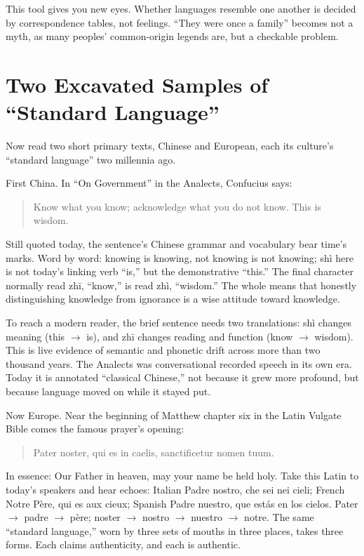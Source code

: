 This tool gives you new eyes. Whether languages resemble one another is decided by correspondence tables, not feelings. ``They were once a family'' becomes not a myth, as many peoples' common-origin legends are, but a checkable problem.

\section{Two Excavated Samples of ``Standard Language''}
Now read two short primary texts, Chinese and European, each its culture's ``standard language'' two millennia ago.

First China. In ``On Government'' in the Analects, Confucius says:

\begin{quote}
Know what you know; acknowledge what you do not know. This is wisdom.
\end{quote}
Still quoted today, the sentence's Chinese grammar and vocabulary bear time's marks. Word by word: knowing is knowing, not knowing is not knowing; shì here is not today's linking verb ``is,'' but the demonstrative ``this.'' The final character normally read zhī, ``know,'' is read zhì, ``wisdom.'' The whole means that honestly distinguishing knowledge from ignorance is a wise attitude toward knowledge.

To reach a modern reader, the brief sentence needs two translations: shì changes meaning (this $\rightarrow$ is), and zhī changes reading and function (know $\rightarrow$ wisdom). This is live evidence of semantic and phonetic drift across more than two thousand years. The Analects was conversational recorded speech in its own era. Today it is annotated ``classical Chinese,'' not because it grew more profound, but because language moved on while it stayed put.

Now Europe. Near the beginning of Matthew chapter six in the Latin Vulgate Bible comes the famous prayer's opening:

\begin{quote}
Pater noster, qui es in caelis, sanctificetur nomen tuum.
\end{quote}
In essence: Our Father in heaven, may your name be held holy. Take this Latin to today's speakers and hear echoes: Italian Padre nostro, che sei nei cieli; French Notre Père, qui es aux cieux; Spanish Padre nuestro, que estás en los cielos. Pater $\rightarrow$ padre $\rightarrow$ père; noster $\rightarrow$ nostro $\rightarrow$ nuestro $\rightarrow$ notre. The same ``standard language,'' worn by three sets of mouths in three places, takes three forms. Each claims authenticity, and each is authentic.

